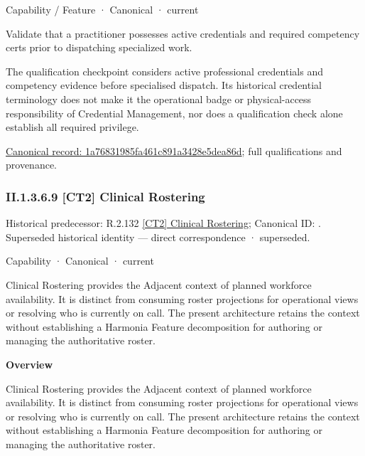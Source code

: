 \label{element:1a76831985fa461c891a3428e5dea86d}
{\small Capability / Feature · Canonical · current}\par

Validate that a practitioner possesses active credentials and required competency certs prior to dispatching specialized work.



The qualification checkpoint considers active professional credentials and competency evidence before specialised dispatch. Its historical credential terminology does not make it the operational badge or physical-access responsibility of Credential Management, nor does a qualification check alone establish all required privilege.


{\footnotesize \href{../../../../continuum/strategy/capability/feature/1a76831985fa461c891a3428e5dea86d.md}{Canonical record: 1a76831985fa461c891a3428e5dea86d}; full qualifications and provenance.}\par
\subsubsection*{II.1.3.6.9 [CT2] Clinical Rostering}
\label{navigation:II.1.3.6.9}

{\small Historical predecessor: R.2.132 \hyperref[element:b6527516a69c499d8cc9c8fe881169fe]{[CT2] Clinical Rostering}; Canonical ID: \texttt{}. Superseded historical identity — direct correspondence · superseded.}\par
\label{element:192ca88a289544dcbf6adaf643f39969}
{\small Capability · Canonical · current}\par

Clinical Rostering provides the Adjacent context of planned workforce availability. It is distinct from consuming roster projections for operational views or resolving who is currently on call. The present architecture retains the context without establishing a Harmonia Feature decomposition for authoring or managing the authoritative roster.



\textbf{Overview}



Clinical Rostering provides the Adjacent context of planned workforce availability. It is distinct from consuming roster projections for operational views or resolving who is currently on call. The present architecture retains the context without establishing a Harmonia Feature decomposition for authoring or managing the authoritative roster.



